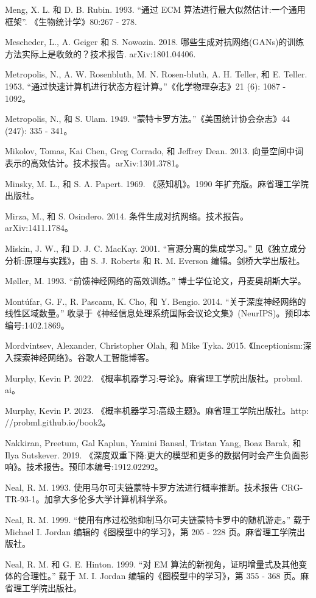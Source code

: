 \documentclass[10pt]{article}
\begin{document}
Meng, X. L. 和 D. B. Rubin. 1993. “通过 ECM 算法进行最大似然估计:一个通用框架”. 《生物统计学》80:267 - 278.

Mescheder, L., A. Geiger 和 S. Nowozin. 2018. 哪些生成对抗网络(GANs)的训练方法实际上是收敛的？技术报告. arXiv:1801.04406.

Metropolis, N., A. W. Rosenbluth, M. N. Rosen-bluth, A. H. Teller, 和 E. Teller. 1953. “通过快速计算机进行状态方程计算。”《化学物理杂志》21 (6): 1087 - 1092。

Metropolis, N., 和 S. Ulam. 1949. “蒙特卡罗方法。”《美国统计协会杂志》44 (247): 335 - 341。

Mikolov, Tomas, Kai Chen, Greg Corrado, 和 Jeffrey Dean. 2013. 向量空间中词表示的高效估计。技术报告。arXiv:1301.3781。

Minsky, M. L., 和 S. A. Papert. 1969. 《感知机》。1990 年扩充版。麻省理工学院出版社。

Mirza, M., 和 S. Osindero. 2014. 条件生成对抗网络。技术报告。arXiv:1411.1784。

Miskin, J. W., 和 D. J. C. MacKay. 2001. “盲源分离的集成学习。” 见《独立成分分析:原理与实践》，由 S. J. Roberts 和 R. M. Everson 编辑。剑桥大学出版社。

Møller, M. 1993. “前馈神经网络的高效训练。” 博士学位论文，丹麦奥胡斯大学。

Montúfar, G. F., R. Pascanu, K. Cho, 和 Y. Bengio. 2014. “关于深度神经网络的线性区域数量。” 收录于《神经信息处理系统国际会议论文集》(NeurIPS)。预印本编号:1402.1869。

Mordvintsev, Alexander, Christopher Olah, 和 Mike Tyka. 2015. 《Inceptionism:深入探索神经网络》。谷歌人工智能博客。

Murphy, Kevin P. 2022. 《概率机器学习:导论》。麻省理工学院出版社。probml. ai。

Murphy, Kevin P. 2023. 《概率机器学习:高级主题》。麻省理工学院出版社。http: //probml.github.io/book2。

Nakkiran, Preetum, Gal Kaplun, Yamini Bansal, Tristan Yang, Boaz Barak, 和 Ilya Sutskever. 2019. 《深度双重下降:更大的模型和更多的数据何时会产生负面影响》。技术报告。预印本编号:1912.02292。

Neal, R. M. 1993. 使用马尔可夫链蒙特卡罗方法进行概率推断。技术报告 CRG-TR-93-1。加拿大多伦多大学计算机科学系。

Neal, R. M. 1999. “使用有序过松弛抑制马尔可夫链蒙特卡罗中的随机游走。” 载于 Michael I. Jordan 编辑的《图模型中的学习》，第 205 - 228 页。麻省理工学院出版社。

Neal, R. M. 和 G. E. Hinton. 1999. “对 EM 算法的新视角，证明增量式及其他变体的合理性。” 载于 M. I. Jordan 编辑的《图模型中的学习》，第 355 - 368 页。麻省理工学院出版社。
\end{document}
